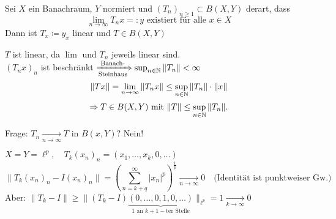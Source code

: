 \begin{kor} \label{kor:9.7}
	Sei $X$ ein Banachraum, $Y$ normiert und $(T_{n})_{n \geq 1} \subset B(X, Y)$ derart, dass
	\[ \lim_{n \rightarrow \infty} T_{n} x =: y \text{ existiert für alle } x \in X \]
	Dann ist $T_{x} \coloneqq y_{x}$ linear und $T \in B(X, Y)$
	\begin{beweis}
		$T$ ist linear, da $\lim$ und $T_{n}$ jeweils linear sind. \\
		$(T_{n} x)_{n}$ ist beschränkt $\xRightarrow[\text{Steinhaus}]{\text{Banach-}} \sup_{n \in \mathbb{N}} \| T_{n} \| < \infty$ \\
		\[ \| T x \| = \lim_{n \rightarrow \infty} \| T_{n} x \| \leq \sup_{n \in \mathbb{N}} \|T_{n} \| \cdot \|x \| \]
		\[ \Rightarrow T \in B(X, Y) \text{ mit } \| T \| \leq \sup_{n \in \mathbb{N}} \| T_{n} \|. \]
	\end{beweis}
\end{kor} 
Frage: $T_{n} \xrightarrow[n \rightarrow \infty]{} T$ in $B(x, Y)$? Nein! \\
\begin{beispiel*}
	$X = Y = \ell^{p}, \quad T_{k} (x_{n})_{n} = (x_{1}, \dotsc, x_{k}, 0, \dotsc)$ \\
	\[ \| T_{k} (x_{n})_{n} - I (x_{n})_{n} \| = \left( \sum_{n = k + q}^{\infty} | x_{n} |^{p} \right)^{\frac{1}{p}} \xrightarrow[n \rightarrow \infty]{} 0 \quad \text{(Identität ist punktweiser Gw.)} \]
	Aber: $\| T_{k} - I \| \geq \|(T_{k} - I)\underbrace{(0, \dotsc, 0, 1, 0, \dotsc)	}_{1 \text{ an } k+1-\text{ter Stelle}} \|_{\ell^{p}} = 1 \xrightarrow[k \rightarrow \infty]{} 0$
\end{beispiel*}



\newpage	